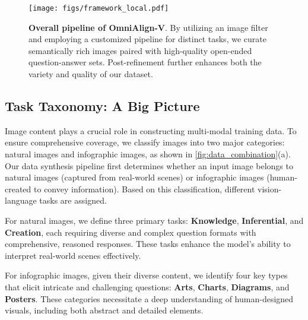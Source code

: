 \begin{figure*}[t]
    \centering
    \texttt{[image: figs/framework\_local.pdf]}
    \caption{\textbf{Overall pipeline of OmniAlign-V}. By utilizing an image filter and employing a customized pipeline for distinct tasks, we curate semantically rich images paired with high-quality open-ended question-answer sets. Post-refinement further enhances both the variety and quality of our dataset.}
    \label{fig:pipeline}
    \vspace{-10pt}
\end{figure*}

\subsection{Task Taxonomy: A Big Picture}


Image content plays a crucial role in constructing multi-modal training data. 
To ensure comprehensive coverage, we classify images into two major categories: natural images and infographic images, as shown in \cref{fig:data_combination}(a). 
Our data synthesis pipeline first determines whether an input image belongs to natural images (captured from real-world scenes) or infographic images (human-created to convey information). 
Based on this classification, different vision-language tasks are assigned.

For natural images, we define three primary tasks: \textbf{Knowledge}, \textbf{Inferential}, and \textbf{Creation}, 
each requiring diverse and complex question formats with comprehensive, reasoned responses. 
These tasks enhance the model's ability to interpret real-world scenes effectively.

For infographic images, given their diverse content, 
we identify four key types that elicit intricate and challenging questions: \textbf{Arts}, \textbf{Charts}, \textbf{Diagrams}, and \textbf{Posters}. 
These categories necessitate a deep understanding of human-designed visuals, 
including both abstract and detailed elements.





